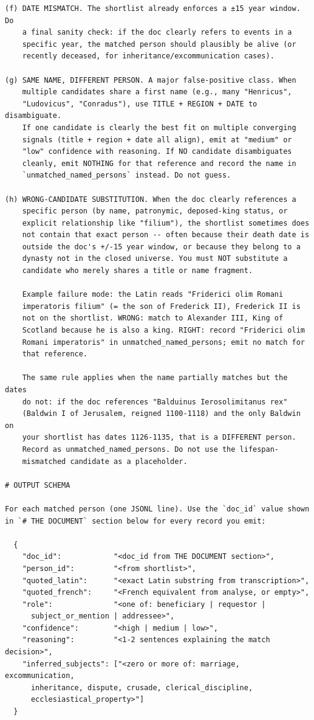 \documentclass[12pt]{article}
\theoremstyle{definition}
\theoremstyle{remark}
\begin{document}
{\begin{verbatim}
(f) DATE MISMATCH. The shortlist already enforces a ±15 year window. Do
    a final sanity check: if the doc clearly refers to events in a
    specific year, the matched person should plausibly be alive (or
    recently deceased, for inheritance/excommunication cases).

(g) SAME NAME, DIFFERENT PERSON. A major false-positive class. When
    multiple candidates share a first name (e.g., many "Henricus",
    "Ludovicus", "Conradus"), use TITLE + REGION + DATE to disambiguate.
    If one candidate is clearly the best fit on multiple converging
    signals (title + region + date all align), emit at "medium" or
    "low" confidence with reasoning. If NO candidate disambiguates
    cleanly, emit NOTHING for that reference and record the name in
    `unmatched_named_persons` instead. Do not guess.

(h) WRONG-CANDIDATE SUBSTITUTION. When the doc clearly references a
    specific person (by name, patronymic, deposed-king status, or
    explicit relationship like "filium"), the shortlist sometimes does
    not contain that exact person -- often because their death date is
    outside the doc's +/-15 year window, or because they belong to a
    dynasty not in the closed universe. You must NOT substitute a
    candidate who merely shares a title or name fragment.

    Example failure mode: the Latin reads "Friderici olim Romani
    imperatoris filium" (= the son of Frederick II), Frederick II is
    not on the shortlist. WRONG: match to Alexander III, King of
    Scotland because he is also a king. RIGHT: record "Friderici olim
    Romani imperatoris" in unmatched_named_persons; emit no match for
    that reference.

    The same rule applies when the name partially matches but the dates
    do not: if the doc references "Balduinus Ierosolimitanus rex"
    (Baldwin I of Jerusalem, reigned 1100-1118) and the only Baldwin on
    your shortlist has dates 1126-1135, that is a DIFFERENT person.
    Record as unmatched_named_persons. Do not use the lifespan-
    mismatched candidate as a placeholder.

# OUTPUT SCHEMA

For each matched person (one JSONL line). Use the `doc_id` value shown
in `# THE DOCUMENT` section below for every record you emit:

  {
    "doc_id":            "<doc_id from THE DOCUMENT section>",
    "person_id":         "<from shortlist>",
    "quoted_latin":      "<exact Latin substring from transcription>",
    "quoted_french":     "<French equivalent from analyse, or empty>",
    "role":              "<one of: beneficiary | requestor |
      subject_or_mention | addressee>",
    "confidence":        "<high | medium | low>",
    "reasoning":         "<1-2 sentences explaining the match decision>",
    "inferred_subjects": ["<zero or more of: marriage, excommunication,
      inheritance, dispute, crusade, clerical_discipline,
      ecclesiastical_property>"]
  }


\end{verbatim}}
\end{document}
